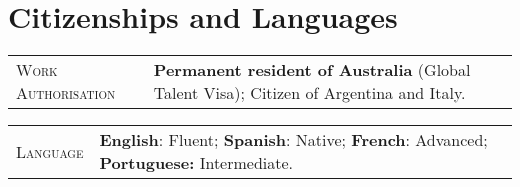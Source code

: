 \documentclass[letterpaper,9pt]{article} %
\begin{document}
\section{Citizenships and Languages}

\begin{tabular}[htb]{>{\raggedleft\arraybackslash}p{}|p{}}
 \textsc{Work Authorisation} & \textbf{Permanent resident of Australia} (Global Talent Visa); Citizen of Argentina and Italy. \\
\end{tabular}

\begin{tabular}[htb]{>{\raggedleft\arraybackslash}p{}|p{}}
	\textsc{Language} & \textbf{English}: Fluent; \textbf{Spanish}: Native; \textbf{French}: Advanced; \textbf{Portuguese:} Intermediate. \\
\end{tabular}
\end{document}
